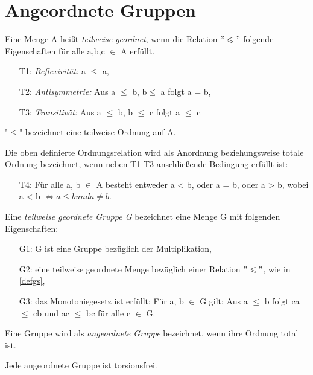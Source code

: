 \section{Angeordnete Gruppen}
%
\begin{defn}\label{defgs} 
Eine Menge A heißt \textit{teilweise geordnet}, wenn die Relation $ "\leqslant" $ folgende Eigenschaften für alle a,b,c $ \in $ A  erfüllt.
%
\begin{enumerate}
\item[T1:] \textit{Reflexivität: } a $\leqslant $ a,
\item[T2:] \textit{Antisymmetrie: } Aus a $\leqslant $ b, b$ \leqslant $ a folgt a = b,
\item[T3:] \textit{Transitivät: } Aus a $ \leqslant $ b, b $\leqslant $ c folgt a $ \leqslant $ c
\end{enumerate}
%
"$ \leqslant $" bezeichnet eine teilweise Ordnung auf A.
\end{defn}
Die oben definierte Ordnungsrelation wird als Anordnung beziehungsweise totale Ordnung bezeichnet, wenn neben T1-T3 anschließende Bedingung erfüllt ist:
%
\begin{enumerate}
\item[T4:] Für alle a, b $ \in $ A besteht entweder a < b, oder a = b, oder a > b, wobei a < b $\Leftrightarrow a \leqslant b und a \neq b$. \cite{fuchs66}
\end{enumerate}
%
%
\begin{defn}\label{twgG}
Eine \textit{teilweise geordnete Gruppe G} bezeichnet eine Menge G mit folgenden Eigenschaften: 
%
\begin{enumerate}
\item[G1:] G ist eine Gruppe bezüglich der Multiplikation,
\item[G2:] eine teilweise geordnete Menge bezüglich einer Relation $" \leqslant "$, wie in \ref{defgs}, 
\item[G3:] das Monotoniegesetz ist erfüllt: Für a, b $\in $ G gilt: Aus a $ \leqslant $ b folgt ca $ \leqslant $ cb und ac $\leqslant $ bc für alle c $\in$ G. \cite{fuchs66}
\end{enumerate}
% 
\end{defn}
%
%
\begin{defn}\label{agG}
Eine Gruppe wird als \textit{angeordnete Gruppe} bezeichnet, wenn ihre Ordnung total ist.
\end{defn}
%
\begin{satz} \label{satzaGtf} 
Jede angeordnete Gruppe ist torsionsfrei. \cite{priesscrampe83}
\end{satz}
